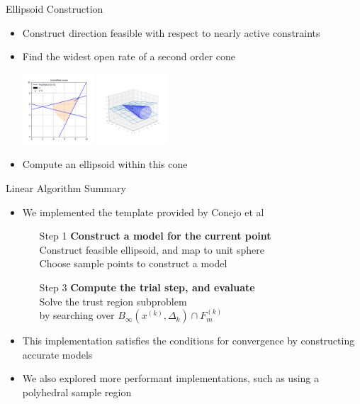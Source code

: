 \documentclass{beamer}
\newcommand{\xk}{{{x}^{(k)}}}
\begin{document}
\begin{frame}{Ellipsoid Construction}
	\begin{itemize}
		\item Construct direction feasible with respect to nearly active constraints
		\item Find the widest open rate of a second order cone
		\begin{center}
			\includegraphics[width=100px]{images/unshifted_cone.png}
			\includegraphics[width=100px]{images/second_order_cone.png}
		\end{center}
		\item Compute an ellipsoid within this cone
	\end{itemize}
\end{frame}


\begin{frame}{Linear Algorithm Summary}
	\begin{itemize}
		\item We implemented the template provided by Conejo et al
		\begin{itemize}
			\item[Step 1] \textbf{Construct a model for the current point} \\
				\color{blue} Construct feasible ellipsoid, and map to unit sphere \color{black}\\
				Choose sample points to construct a model \\
			\item[Step 3] \textbf{Compute the trial step, and evaluate} \\
				Solve the trust region subproblem \\
				\color{blue} by searching over $B_{\infty}\left(\xk, \Delta_k\right) \cap F_m^{(k)}$\color{black}
		\end{itemize}
		\item This implementation satisfies the conditions for convergence by constructing accurate models
		\item We also explored more performant implementations, such as using a polyhedral sample region
	\end{itemize}
\end{frame}
\end{document}
